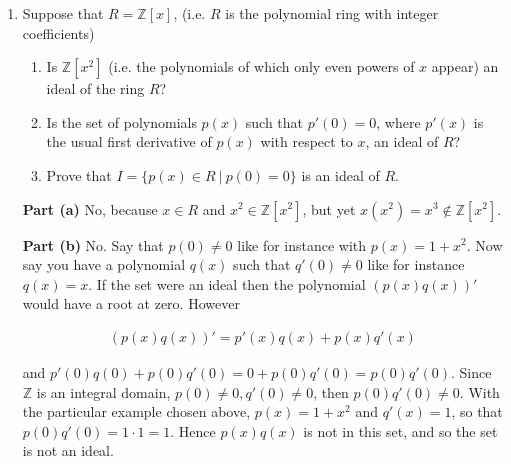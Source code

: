 \documentclass[11pt]{article}
\begin{document}
\begin{enumerate}
Finally, if $\varphi(1)=\overline{16}$ then $\varphi(x)=\overline{16x}=\overline 0$ just in case $x$ has a factor of $5$ and therefore $\ker\varphi$ is all multiples of 5.  $\text{Im}\varphi$ is all multiples of $\overline{16}$, but in this case finding these takes more work.  They include

\begin{align*}
	\overline 0\\
	\overline {16}\\
	\overline{32}=\overline{12}\\
	\overline{48}=\overline{8}\\
	\overline{64}=\overline 4\\
	\overline{80}=\overline 0
\end{align*}

All other values repeat after these, so $\text{Im}\varphi$ is all multiples of 4.

\item Suppose that $R=\mathbb{Z}[x]$, (i.e. $R$ is the polynomial ring with integer coefficients)
\begin{enumerate}
	\item Is $\mathbb{Z}[x^2]$ (i.e. the polynomials of which only even powers of $x$ appear) an ideal of the ring $R$?
	\item Is the set of polynomials $p(x)$ such that $p'(0)=0$, where $p'(x)$ is the usual first derivative of $p(x)$ with respect to $x$, an ideal of $R$?
	\item Prove that $I=\{p(x)\in R \ | \ p(0)=0\}$ is an ideal of $R$.
\end{enumerate}

{\bf Part (a)} No, because $x\in R$ and $x^2\in \mathbb Z[x^2]$, but yet $x(x^2)=x^3\not\in\mathbb Z[x^2]$.

{\bf Part (b)} No.  Say that $p(0)\ne 0$ like for instance with $p(x)=1+x^2$.  Now say you have a polynomial $q(x)$ such that $q'(0)\ne 0$ like for instance $q(x) = x$.  If the set were an ideal then the polynomial $(p(x)q(x))'$ would have a root at zero.  However

\begin{align*}
	(p(x)q(x))'=p'(x)q(x)+p(x)q'(x)
\end{align*}

and $p'(0)q(0)+p(0)q'(0) = 0+p(0)q'(0)=p(0)q'(0)$.  Since $\mathbb Z$ is an integral domain, $p(0)\ne 0, q'(0)\ne 0$, then $p(0)q'(0)\ne 0$.  With the particular example chosen above, $p(x)=1+x^2$ and $q'(x)=1$, so that $p(0)q'(0)=1\cdot 1 = 1$.  Hence $p(x)q(x)$ is not in this set, and so the set is not an ideal.


\end{enumerate}
\end{document}
